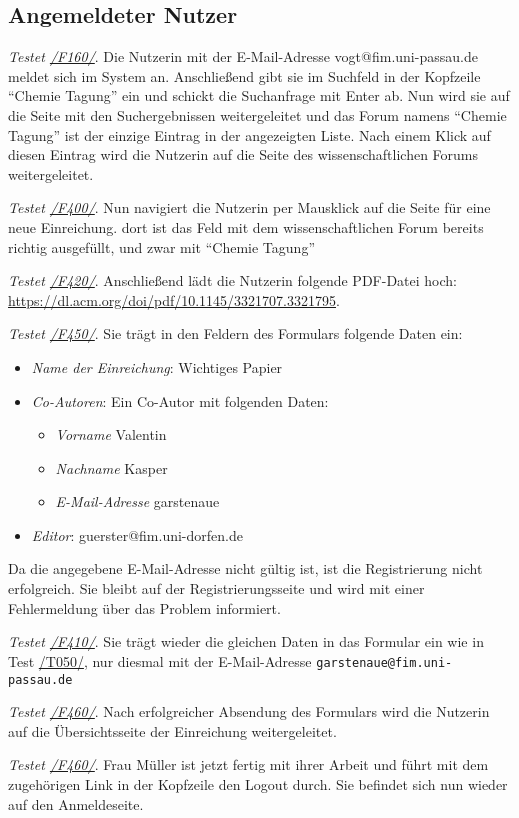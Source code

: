\subsection{Angemeldeter Nutzer}
\begin{description}

	 \emph{Testet \hyperref[funkt:160]{/F160/}}.
	Die Nutzerin mit der E-Mail-Adresse vogt@fim.uni-passau.de meldet sich im System an.
	Anschließend gibt sie im Suchfeld in der Kopfzeile ``Chemie Tagung'' ein und schickt die Suchanfrage mit Enter ab.
	Nun wird sie auf die Seite mit den Suchergebnissen weitergeleitet und das Forum namens ``Chemie Tagung'' ist der einzige Eintrag in der angezeigten Liste.
	Nach einem Klick auf diesen Eintrag wird die Nutzerin auf die Seite des wissenschaftlichen Forums weitergeleitet.

	 \emph{Testet \hyperref[funkt:400]{/F400/}}.
	Nun navigiert die Nutzerin per Mausklick auf die Seite für eine neue Einreichung.
	dort ist das Feld mit dem wissenschaftlichen Forum bereits richtig ausgefüllt, und zwar mit ``Chemie Tagung''

	 \emph{Testet \hyperref[funkt:420]{/F420/}}.
	Anschließend lädt die Nutzerin folgende PDF-Datei hoch: \href{https://dl.acm.org/doi/pdf/10.1145/3321707.3321795}{https://dl.acm.org/doi/pdf/10.1145/3321707.3321795}.

	 \emph{Testet \hyperref[funkt:450]{/F450/}}.
	Sie trägt in den Feldern des Formulars folgende Daten ein:
	\begin{itemize}
		\item \emph{Name der Einreichung}: Wichtiges Papier
		\item \emph{Co-Autoren}: Ein Co-Autor mit folgenden Daten:
		\begin{itemize}
			\item \emph{Vorname} Valentin
			\item \emph{Nachname} Kasper
			\item \emph{E-Mail-Adresse} garstenaue
		\end{itemize}
		\item \emph{Editor}: guerster@fim.uni-dorfen.de
	\end{itemize}
	Da die angegebene E-Mail-Adresse nicht gültig ist, ist die Registrierung nicht erfolgreich.
	Sie bleibt auf der Registrierungsseite und wird mit einer Fehlermeldung über das Problem informiert.

	 \emph{Testet \hyperref[funkt:410]{/F410/}}.
	Sie trägt wieder die gleichen Daten in das Formular ein wie in Test \hyperref[t050]{/T050/}, nur diesmal mit der E-Mail-Adresse \texttt{garstenaue@fim.uni-passau.de}

	 \emph{Testet \hyperref[funkt:460]{/F460/}}.
	Nach erfolgreicher Absendung des Formulars wird die Nutzerin auf die Übersichtsseite der Einreichung weitergeleitet.

	 \emph{Testet \hyperref[funkt:460]{/F460/}}.
	Frau Müller ist jetzt fertig mit ihrer Arbeit und führt mit dem zugehörigen Link in der Kopfzeile den Logout durch.
	Sie befindet sich nun wieder auf den Anmeldeseite.
\end{description}

